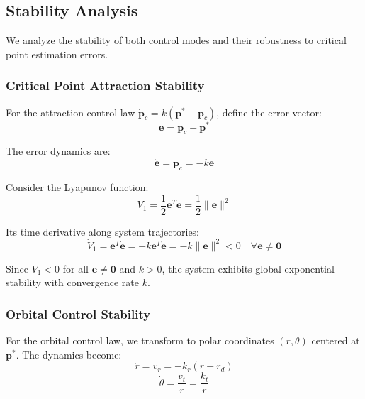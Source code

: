 \documentclass[lettersize,journal]{IEEEtran}
\begin{document}
\subsection{Stability Analysis}

We analyze the stability of both control modes and their robustness to critical point estimation errors.

\subsubsection{Critical Point Attraction Stability}

For the attraction control law $\dot{\mathbf{p}}_c = k(\mathbf{p}^* - \mathbf{p}_c)$, define the error vector:
\begin{equation}
\mathbf{e} = \mathbf{p}_c - \mathbf{p}^*
\end{equation}

The error dynamics are:
\begin{equation}
\dot{\mathbf{e}} = \dot{\mathbf{p}}_c = -k\mathbf{e}
\end{equation}

Consider the Lyapunov function:
\begin{equation}
V_1 = \frac{1}{2}\mathbf{e}^T\mathbf{e} = \frac{1}{2}\|\mathbf{e}\|^2
\end{equation}

Its time derivative along system trajectories:
\begin{equation}
\dot{V}_1 = \mathbf{e}^T\dot{\mathbf{e}} = -k\mathbf{e}^T\mathbf{e} = -k\|\mathbf{e}\|^2 < 0 \quad \forall \mathbf{e} \neq \mathbf{0}
\end{equation}

Since $\dot{V}_1 < 0$ for all $\mathbf{e} \neq \mathbf{0}$ and $k > 0$, the system exhibits global exponential stability with convergence rate $k$.

\subsubsection{Orbital Control Stability}

For the orbital control law, we transform to polar coordinates $(r, \theta)$ centered at $\mathbf{p}^*$. The dynamics become:
\begin{equation}
\dot{r} = v_r = -k_r(r - r_d)
\end{equation}
\begin{equation}
\dot{\theta} = \frac{v_t}{r} = \frac{k_t}{r}
\end{equation}
\end{document}
